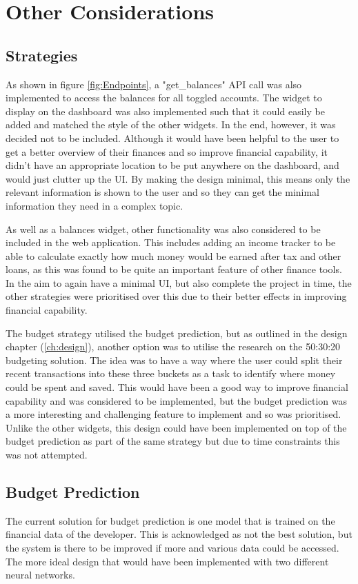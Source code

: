 \section{Other Considerations}

\subsection{Strategies}
As shown in figure \ref{fig:Endpoints}, a "get\_balances" API call was also implemented to access the balances for all toggled accounts. The widget to display on the dashboard was also implemented such that it could easily be added and matched the style of the other widgets. In the end, however, it was decided not to be included. Although it would have been helpful to the user to get a better overview of their finances and so improve financial capability, it didn't have an appropriate location to be put anywhere on the dashboard, and would just clutter up the UI. By making the design minimal, this means only the relevant information is shown to the user and so they can get the minimal information they need in a complex topic.

As well as a balances widget, other functionality was also considered to be included in the web application. This includes adding an income tracker to be able to calculate exactly how much money would be earned after tax and other loans, as this was found to be quite an important feature of other finance tools. In the aim to again have a minimal UI, but also complete the project in time, the other strategies were prioritised over this due to their better effects in improving financial capability.

The budget strategy utilised the budget prediction, but as outlined in the design chapter (\ref{ch:design}), another option was to utilise the research on the 50:30:20 budgeting solution. The idea was to have a way where the user could split their recent transactions into these three buckets as a task to identify where money could be spent and saved. This would have been a good way to improve financial capability and was considered to be implemented, but the budget prediction was a more interesting and challenging feature to implement and so was prioritised. Unlike the other widgets, this design could have been implemented on top of the budget prediction as part of the same strategy but due to time constraints this was not attempted.

\subsection{Budget Prediction}
The current solution for budget prediction is one model that is trained on the financial data of the developer. This is acknowledged as not the best solution, but the system is there to be improved if more and various data could be accessed. The more ideal design that would have been implemented with two different neural networks.

